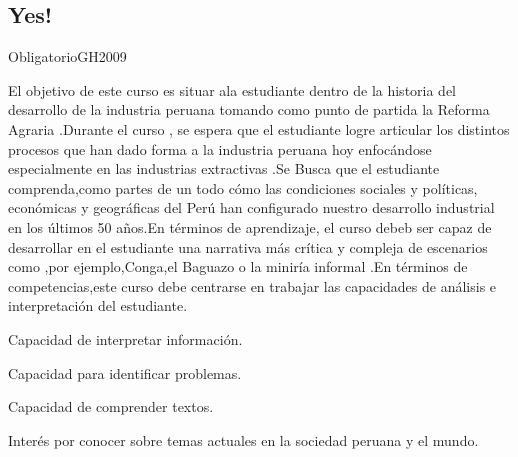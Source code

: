 \begin{syllabus}

\section{Yes!}{Obligatorio}{GH2009}

\begin{justification}
El objetivo de este curso es situar ala estudiante dentro de la historia del desarrollo de la industria peruana tomando como punto de partida la Reforma Agraria .Durante el curso , se espera que el estudiante logre articular los distintos 
procesos que han dado forma a  la industria peruana hoy enfocándose  especialmente en las industrias extractivas .Se Busca que el estudiante  comprenda,como partes de un todo cómo las condiciones sociales y políticas,
económicas y geográficas del Perú  han configurado nuestro desarrollo industrial en los últimos 50 años.En términos de aprendizaje, el curso debeb ser capaz de desarrollar en el estudiante  una narrativa más crítica y compleja de escenarios como ,por ejemplo,Conga,el  Baguazo 
o la  miniría informal .En términos de competencias,este curso debe centrarse en  trabajar las capacidades de análisis e interpretación del estudiante.

\end{justification}

\begin{goals}
\item Capacidad de interpretar información.
\item Capacidad para identificar problemas.
\item Capacidad de comprender textos.
\item Interés por conocer sobre temas actuales en la sociedad peruana y el mundo. 
\end{goals}

\begin{outcomes}
    \item {} %
    \item {} %
    \item {} %
    \item {} %
    \item {} %
\end{outcomes}

\begin{competences}
    \item {}
    \item {}
    \item {}
    \item {}
\end{competences}


\end{syllabus}
